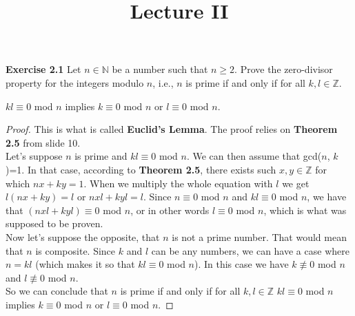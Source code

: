 \documentclass{article}
\title{\vspace{-2cm}Lecture II\vspace{-2cm}}
\date{}
\begin{document}
\maketitle
\noindent \textbf{Exercise 2.1} Let $n \in \mathbb{N}$ be a number such that $n \geq 2$. Prove the zero-divisor property for the integers modulo $n$, i.e., $n$ is prime if and only if for all $k, l \in \mathbb{Z}$.
\begin{center}
 $kl \equiv 0$ mod $n$ implies $k \equiv 0$ mod $n$ or $l \equiv 0$ mod $n$.
 \end{center}
\begin{proof}
  This is what is called \textbf{Euclid's Lemma}. The proof relies on \textbf{Theorem 2.5} from slide 10.\\
 Let's suppose $n$ is prime and $kl \equiv 0$ mod $n$. We can then assume that gcd($n$, $k$)=1. In that case, according to \textbf{Theorem 2.5}, there exists such $x, y \in \mathbb{Z}$ for which $nx + ky = 1$. When we multiply the whole equation with $l$ we get $l(nx + ky) = l$ or $nxl + kyl = l$. Since $n \equiv 0$ mod $n$ and $kl \equiv 0$ mod $n$, we have that $(nxl + kyl) \equiv 0$ mod $n$, or in other words $l \equiv 0$ mod $n$, which is what was supposed to be proven.\\
 Now let's suppose the opposite, that $n$ is not a prime number. That would mean that $n$ is composite. Since $k$ and $l$ can be any numbers, we can have a case where $n=kl$ (which makes it so that $kl \equiv 0$ mod $n$). In this case we have $k \not\equiv 0$ mod $n$ and $l \not\equiv 0$ mod $n$. \\
 So we can conclude that $n$ is prime if and only if for all $k, l \in \mathbb{Z}$ $kl \equiv 0$ mod $n$ implies $k \equiv 0$ mod $n$ or $l \equiv 0$ mod $n$.
\end{proof}
\end{document}
